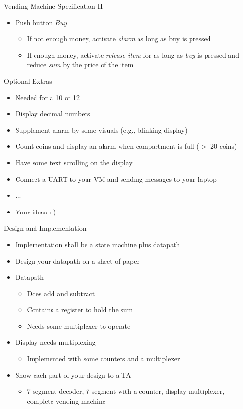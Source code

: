 \begin{frame}[fragile]{Vending Machine Specification II}
\begin{itemize}
\item Push button \emph{Buy}
\begin{itemize}
\item If not enough money, activate \emph{alarm} as long as buy is pressed
\item If enough money, activate \emph{release item} for as long as \emph{buy}
is pressed and reduce \emph{sum} by the price of the item
\end{itemize}
\end{itemize}
\end{frame}

\begin{frame}[fragile]{Optional Extras}
\begin{itemize}
\item Needed for a 10 or 12
\item Display decimal numbers
\item Supplement alarm by some visuals (e.g., blinking display)
\item Count coins and display an alarm when compartment is full ($>$ 20 coins)
\item Have some text scrolling on the display
\item Connect a UART to your VM and sending messages to your laptop
\item ...
\item Your ideas :-)
\end{itemize}
\end{frame}

\begin{frame}[fragile]{Design and Implementation}
\begin{itemize}
\item Implementation shall be a state machine plus datapath
\item Design your datapath on a sheet of paper
\item Datapath
\begin{itemize}
\item Does add and subtract
\item Contains a register to hold the sum
\item Needs some multiplexer to operate
\end{itemize}
\item Display needs multiplexing
\begin{itemize}
\item Implemented with some counters and a multiplexer
\end{itemize}
\item Show each part of your design to a TA
\begin{itemize}
\item 7-segment decoder, 7-segment with a counter, display multiplexer, complete vending machine
\end{itemize}
\end{itemize}
\end{frame}

